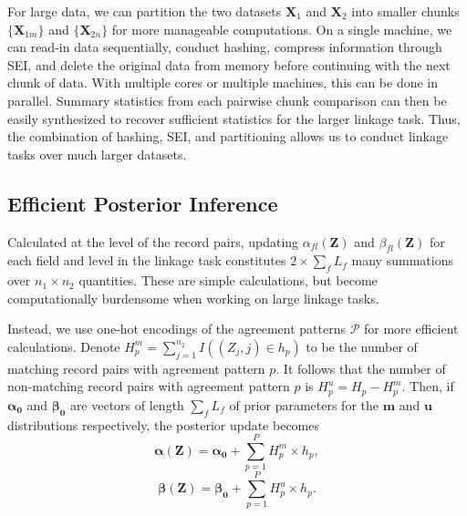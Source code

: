 \documentclass[ba]{imsart}
\begin{document}

For large data, we can partition the two datasets \(\bm{X}_1\) and \(\bm{X}_2\) into smaller chunks \(\{\bm{X}_{1m}\}\) and \(\{\bm{X}_{2n}\}\) for more manageable computations. On a single machine, we can read-in data sequentially, conduct hashing, compress information through SEI, and delete the original data from memory before continuing with the next chunk of data. With multiple cores or multiple machines, this can be done in parallel. Summary statistics from each pairwise chunk comparison can then be easily synthesized to recover sufficient statistics for the larger linkage task.  Thus, the combination of hashing, SEI, and partitioning
allows us to conduct linkage tasks over much larger datasets.

\hypertarget{efficient-posterior}{%
	\subsection{Efficient Posterior Inference }\label{efficient-posterior}}

Calculated at the level of the record pairs, updating  \(\alpha_{fl}(\bm{Z})\) and \(\beta_{fl}(\bm{Z})\) for each field and level in the linkage task constitutes \(2 \times \sum_f L_f\) many summations over \(n_1 \times n_2\) quantities. These are simple calculations, but become computationally burdensome when working on large linkage tasks. 

Instead, we use one-hot encodings of the agreement patterns $\mathcal{P}$ for more efficient calculations. Denote $H_p^m = \sum_{j=1}^{n_2} I\left((Z_j, j) \in h_p\right)$ to be the number of matching record pairs with agreement pattern $p$. It follows that the number of non-matching record pairs with agreement pattern $p$ is \(H_p^u = H_p - H_p^m\). Then, if $\bm{\alpha_0}$ and $\bm{\beta_0}$ are vectors  of length $\sum_f L_f$ of prior parameters for the $\bm{m}$ and $\bm{u}$ distributions respectively, the posterior update becomes
$$\bm{\alpha(Z)} = \bm{\alpha_0} + \sum_{p=1}^P H_p^m \times h_p,$$
$$\bm{\beta(Z)} = \bm{\beta_0} + \sum_{p=1}^P H_p^u \times h_p.$$
\end{document}
